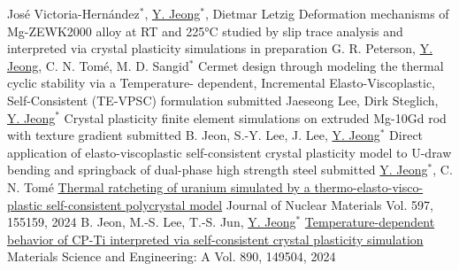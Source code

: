 
\begin{cventries}



  \cventry
  {Jos\'{e} Victoria-Hern\'{a}ndez$^*$, \underline{Y. Jeong}$^*$, Dietmar Letzig}
  {Deformation mechanisms of Mg-ZEWK2000 alloy at RT and 225°C studied by slip trace analysis and interpreted via crystal plasticity simulations}
  {in preparation}
  {}
  {
  }
  \cventry
  {G. R. Peterson, \underline{Y. Jeong}, C. N. Tom\'{e}, M. D. Sangid$^*$}
  {Cermet design through modeling the thermal cyclic stability via a Temperature- dependent, Incremental Elasto-Viscoplastic, Self-Consistent (TE-VPSC) formulation}
  {submitted}
  {}
  {
  }
  \cventry
  {Jaeseong Lee, Dirk Steglich, \underline{Y. Jeong}$^*$}
  {Crystal plasticity finite element simulations on extruded Mg-10Gd rod with texture gradient}
  {submitted}
  {}
  {
  }
  \cventry
  {B. Jeon, S.-Y. Lee, J. Lee, \underline{Y. Jeong}$^*$}
  {Direct application of elasto-viscoplastic self-consistent crystal plasticity model to U-draw bending and springback of dual-phase high strength steel}
  {submitted}
  {}
  {
  }
  \cventry
  {\underline{Y. Jeong}$^*$, C. N. Tom\'{e}}
  {\href{https://doi.org/10.1016/j.jnucmat.2024.155159}{Thermal ratcheting of uranium simulated by a thermo-elasto-visco-plastic self-consistent polycrystal model}}
  {Journal of Nuclear Materials}
  {Vol. 597, 155159, 2024}
  {
  }
  \cventry
  {B. Jeon, M.-S. Lee, T.-S. Jun, \underline{Y. Jeong}$^*$}
  {\href{https://doi.org/10.1016/j.msea.2023.145904}{Temperature-dependent behavior of CP-Ti interpreted via self-consistent crystal plasticity simulation}}
  {Materials Science and Engineering: A}
  {Vol. 890, 149504, 2024}
  {
  }

\end{cventries}
